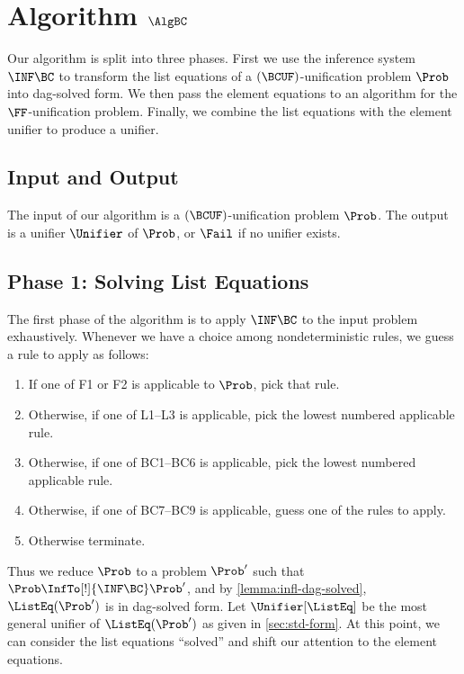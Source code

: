 \section{Algorithm $\AlgBC$}\label{sec:bc-algorithm}

Our algorithm is split into three phases. First we use the inference system
$\INF\BC$ to transform the list equations of a $(\BCUF)$-unification problem
$\Prob$ into dag-solved form. We then pass the element equations to an
algorithm for the $\FF$-unification problem. Finally, we combine the list
equations with the element unifier to produce a unifier.

\subsection*{Input and Output}

The input of our algorithm is a $(\BCUF)$-unification problem $\Prob$. The
output is a unifier $\Unifier$ of $\Prob$, or $\Fail$ if no unifier exists.

\subsection*{Phase 1: Solving List Equations}

The first phase of the algorithm is to apply $\INF\BC$ to the input problem
exhaustively. Whenever we have a choice among nondeterministic rules, we
guess a rule to apply as follows:
\begin{enumerate}[(1)]
    \item If one of F1 or F2 is applicable to $\Prob$, pick that rule.
    \item Otherwise, if one of L1--L3 is applicable, pick the lowest
        numbered applicable rule.
    \item Otherwise, if one of BC1--BC6 is applicable, pick the lowest
        numbered applicable rule.
    \item Otherwise, if one of BC7--BC9 is applicable, guess one of
        the rules to apply.
    \item Otherwise terminate.
\end{enumerate}

Thus we reduce $\Prob$ to a problem $\Prob'$ such that $\Prob
\InfTo[!]{\INF\BC} \Prob'$, and by \cref{lemma:infl-dag-solved},
$\ListEq(\Prob')$ is in dag-solved form. Let $\Unifier[\ListEq]$ be the most
general unifier of $\ListEq(\Prob')$ as given in \cref{sec:std-form}. At this
point, we can consider the list equations ``solved'' and shift our attention to
the element equations.

